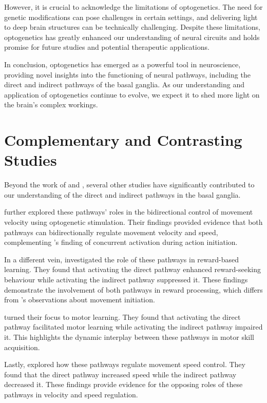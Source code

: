 \documentclass[10pt]{article}
\begin{document}
\begin{sloppypar}
  However, it is crucial to acknowledge the limitations of optogenetics. The need for genetic modifications can pose challenges in certain settings, and delivering light to deep brain structures can be technically challenging. Despite these limitations, optogenetics has greatly enhanced our understanding of neural circuits and holds promise for future studies and potential therapeutic applications.

  In conclusion, optogenetics has emerged as a powerful tool in neuroscience, providing novel insights into the functioning of neural pathways, including the direct and indirect pathways of the basal ganglia. As our understanding and application of optogenetics continue to evolve, we expect it to shed more light on the brain’s complex workings.

  \section{Complementary and Contrasting Studies}
  \label{sec:complementary-and-contrasting-studies}

  Beyond the work of \cite{cui_concurrent_2013} and \cite{kravitz_regulation_2010}, several other studies have significantly contributed to our understanding of the direct and indirect pathways in the basal ganglia.

  \cite{yttri_opponent_2016} further explored these pathways’ roles in the bidirectional control of movement velocity using optogenetic stimulation. Their findings provided evidence that both pathways can bidirectionally regulate movement velocity and speed, complementing \cite{cui_concurrent_2013} ’s finding of concurrent activation during action initiation.

  In a different vein, \cite{guillaumin_experimental_2021} investigated the role of these pathways in reward-based learning. They found that activating the direct pathway enhanced reward-seeking behaviour while activating the indirect pathway suppressed it. These findings demonstrate the involvement of both pathways in reward processing, which differs from \cite{cui_concurrent_2013} ’s observations about movement initiation.

  \cite{hilt_evidence_2016} turned their focus to motor learning. They found that activating the direct pathway facilitated motor learning while activating the indirect pathway impaired it. This highlights the dynamic interplay between these pathways in motor skill acquisition.

  Lastly, \cite{wang_direct_2015} explored how these pathways regulate movement speed control. They found that the direct pathway increased speed while the indirect pathway decreased it. These findings provide evidence for the opposing roles of these pathways in velocity and speed regulation.


\end{sloppypar}
\end{document}
